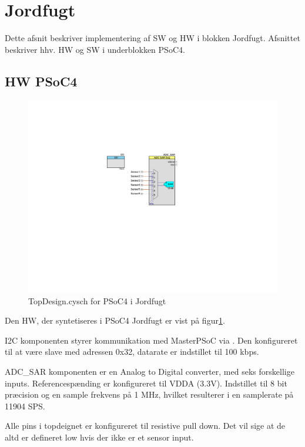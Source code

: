\section{Jordfugt} \label{sec:JrdImpl}

Dette afsnit beskriver implementering af SW og HW i blokken Jordfugt. Afsnittet beskriver hhv. HW og SW i underblokken PSoC4.

\subsection{HW PSoC4}
\begin{figure}[h]
\centering 
\includegraphics[width={\textwidth-6cm}, trim = 250 270 310 160, clip=true] {../fig/TopDesign_Jordfugt.pdf}
\caption{TopDesign.cysch for PSoC4 i Jordfugt}
\label{fig:topdesign_jordfugt}
\end{figure}

Den HW, der syntetiseres i PSoC4 Jordfugt er vist på figur\ref{fig:topdesign_jordfugt}. 

I2C komponenten styrer kommunikation med MasterPSoC via \IIC. 
Den konfigureret til at være slave med adressen 0x32, datarate er indstillet til 100 kbps.

ADC\_SAR komponenten er en Analog to Digital converter, med seks forskellige inputs. Referencespænding er konfigureret til VDDA (3.3V).
Indstillet til 8 bit præcision og en sample frekvens på 1 MHz, hvilket resulterer i en samplerate på 11904 SPS.

Alle pins i topdeignet er konfigureret til resistive pull down. 
Det vil sige at de altd er defineret low hvis der ikke er et sensor input.

